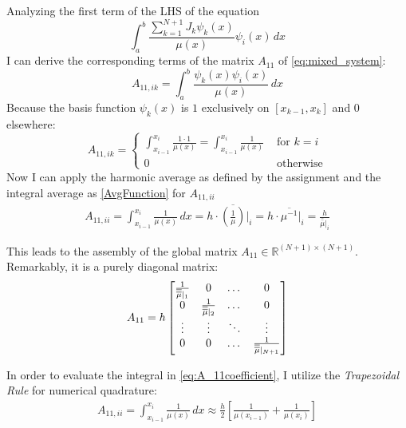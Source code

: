 \documentclass{article}
\begin{document}
Analyzing the first term of the LHS of the equation
\begin{equation*}
    \int_a^b \frac{\sum_{k=1}^{N+1} J_k \psi_k(x)}{\mu(x)} \psi_i(x) \, dx
\end{equation*}
I can derive the corresponding terms of the matrix $A_{11}$ of \eqref{eq:mixed_system}:
\begin{equation*}
    A_{11,ik} = \int_a^b \frac{\psi_k(x) \psi_i(x)}{\mu(x)} \, dx
\end{equation*}
Because the basis function $\psi_k(x)$ is $1$ exclusively on $[x_{k-1}, x_k]$ and $0$ elsewhere:
\begin{equation*}
    A_{11,ik} = 
    \begin{cases}
        \int_{x_{i-1}}^{x_i} \frac{1 \cdot 1 }{\mu(x)} = \int_{x_{i-1}}^{x_i} \frac{1}{\mu(x)} &\text{  for } k=i \\
        0 &\text{  otherwise} 
    \end{cases}
\end{equation*}
Now I can apply the harmonic average as defined by the assignment and the integral average as \eqref{AvgFunction} for $A_{11,ii}$
\begin{align}
   A_{11,ii} = \int_{x_{i-1}}^{x_i} \frac{1}{\mu(x)} \, dx = h \cdot \overline{\left(\frac{1}{\mu}\right)}\big|_i = h \cdot \overline{\mu^{-1}}\big|_i = \frac{h}{\bar{\bar{\mu}}\big|_i}
   \label{eq:A_11coefficient}
\end{align}

This leads to the assembly of the global matrix $A_{11} \in \mathbb{R}^{(N+1) \times (N+1)}$. Remarkably, it is a purely diagonal matrix:
\begin{equation*} \label{eq:matrix_A11}
    A_{11} = h
    \begin{bmatrix}
        \frac{1}{\overline{\vphantom{\rule{0pt}{1.2ex}}\smash{\overline{\mu}}}|_1} & 0 & \dots & 0 \\
        0 & \frac{1}{\overline{\vphantom{\rule{0pt}{1.2ex}}\smash{\overline{\mu}}}|_2} & \dots & 0 \\
        \vdots & \vdots & \ddots & \vdots \\
        0 & 0 & \dots & \frac{1}{\overline{\vphantom{\rule{0pt}{1.2ex}}\smash{\overline{\mu}}}|_{N+1}}
    \end{bmatrix}
\end{equation*}

In order to evaluate the integral in \eqref{eq:A_11coefficient}, I utilize the \textit{Trapezoidal Rule} for numerical quadrature:
\begin{align}
    A_{11,ii} = \int_{x_{i-1}}^{x_i} \frac{1}{\mu(x)} \, dx \approx \frac{h}{2} \left[ \frac{1}{\mu(x_{i-1})} + \frac{1}{\mu(x_i)} \right]
    \label{eq:HarmMeanQuad}
\end{align}
\end{document}
